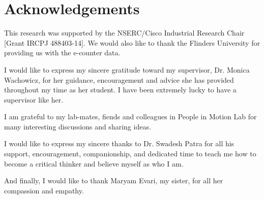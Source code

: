 \chapter*{Acknowledgements}

This research was supported by the NSERC/Cisco Industrial Research Chair [Grant IRCPJ 488403-14]. We would also like to thank the Flinders University for providing us with the e-counter data.

I would like to express my sincere gratitude toward my supervisor, Dr. Monica Wachowicz, for her guidance, encouragement and advice she has provided throughout my time as her student. I have been extremely lucky to have a supervisor like her.


I am  grateful to my lab-mates, fiends and colleagues in People in Motion Lab for many interesting discussions and sharing ideas. 

I would like to express my sincere thanks to Dr. Swadesh Patra for all his support, encouragement, companionship, and dedicated time to teach me how to become a critical thinker and believe myself as who I am.  

And finally, I would like to thank Maryam Evari, my sister, for all her compassion and empathy. 
